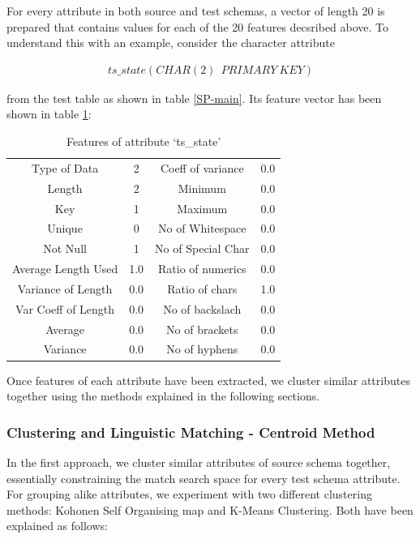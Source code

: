 \documentclass[conference]{IEEEtran}
\begin{document}
For every attribute in both source and test schemas, a vector of length 20 is prepared that contains values for each of the 20 features decsribed above. To understand this with an example, consider the character attribute 

\noindent
\begin{align*}
ts\_state (CHAR(2)\ \ PRIMARY\ KEY)  
\end{align*}

\noindent
from the test table as shown in table \ref{SP-main}. Its feature vector has been shown in table \ref{features}:

\begin{table}[h]
\centering
\caption{Features of attribute `ts\_state'}
\begin{tabular}{|c|c|c|c|}
\hline
Type of Data & 2 & Coeff of variance & 0.0\\
Length & 2 & Minimum & 0.0\\
Key & 1 & Maximum & 0.0\\
Unique & 0 & No of Whitespace & 0.0\\
Not Null & 1 & No of Special Char & 0.0\\
Average Length Used & 1.0 & Ratio of numerics & 0.0\\
Variance of Length & 0.0 & Ratio of chars & 1.0\\	
Var Coeff of Length & 0.0 & No of backslach & 0.0\\
Average & 0.0 & No of brackets & 0.0\\
Variance & 0.0 & No of hyphens & 0.0\\
\hline
\end{tabular}
\label{features}
\end{table}

Once features of each attribute have been extracted, we cluster similar attributes together using the methods explained in the following sections.

\subsubsection*{\textbf{Clustering and Linguistic Matching - Centroid Method}}

In the first approach, we cluster similar attributes of source schema together, essentially constraining the match search space for every test schema attribute.  For grouping alike attributes, we experiment with two different clustering methods: Kohonen Self Organising map and K-Means Clustering. Both have been explained as follows:
\end{document}
